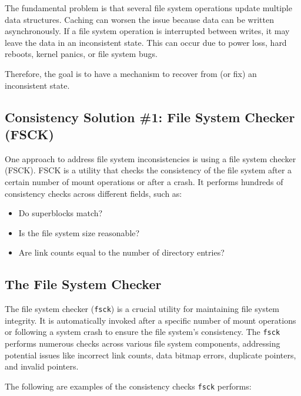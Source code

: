\documentclass[../../compsys.tex]{subfiles}
\begin{document}
The fundamental problem is that several file system operations update multiple data structures. Caching can worsen the issue because data can be written asynchronously. If a file system operation is interrupted between writes, it may leave the data in an inconsistent state. This can occur due to power loss, hard reboots, kernel panics, or file system bugs.

Therefore, the goal is to have a mechanism to recover from (or fix) an inconsistent state.

\subsection{Consistency Solution \#1: File System Checker (FSCK)}

One approach to address file system inconsistencies is using a file system checker (FSCK). FSCK is a utility that checks the consistency of the file system after a certain number of mount operations or after a crash. It performs hundreds of consistency checks across different fields, such as:

\begin{itemize}
    \item Do superblocks match?
    \item Is the file system size reasonable?
    \item Are link counts equal to the number of directory entries?
\end{itemize}
\subsection{The File System Checker}

The file system checker (\texttt{fsck}) is a crucial utility for maintaining file system integrity. It is automatically invoked after a specific number of mount operations or following a system crash to ensure the file system's consistency. The \texttt{fsck} performs numerous checks across various file system components, addressing potential issues like incorrect link counts, data bitmap errors, duplicate pointers, and invalid pointers.

The following are examples of the consistency checks \texttt{fsck} performs:
\end{document}
